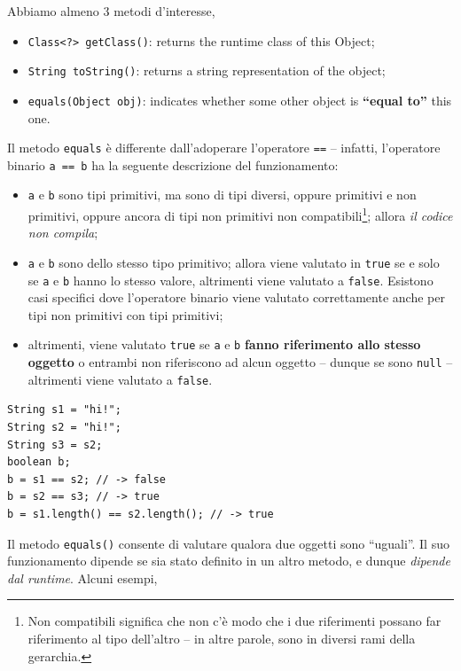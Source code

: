 \documentclass[\fontsizeclass,twocolumn]{\classname}
\theoremstyle{definition}
\theoremstyle{definition}
\begin{document}
Abbiamo almeno $3$ metodi d'interesse,

\begin{itemize}
  \item \texttt{Class<?> getClass()}: returns the runtime class of this Object;
  \item \texttt{String toString()}: returns a string representation of the
  object;
  \item \texttt{equals(Object obj)}: indicates whether some other object is
      \textbf{``equal to''} this one.
\end{itemize}

Il metodo \texttt{equals} è differente dall'adoperare l'operatore \texttt{==}
\--- infatti, l'operatore binario \texttt{a == b} ha la seguente descrizione del
funzionamento:

\begin{itemize}
  \item \texttt{a} e \texttt{b} sono tipi primitivi, ma sono di tipi diversi,
  oppure primitivi e non primitivi, oppure ancora di tipi non primitivi non
  compatibili\footnote{Non compatibili significa che non c'è modo che i due
  riferimenti possano far riferimento al tipo dell'altro \--- in altre parole,
  sono in diversi rami della gerarchia.}; allora \emph{il codice non compila};
  \item \texttt{a} e \texttt{b} sono dello stesso tipo primitivo; allora viene
  valutato in \texttt{true} se e solo se \texttt{a} e \texttt{b} hanno lo stesso
  valore, altrimenti viene valutato a \texttt{false}. Esistono casi specifici
  dove l'operatore binario viene valutato correttamente anche per tipi non
  primitivi con tipi primitivi;
  \item altrimenti, viene valutato \texttt{true} se \texttt{a} e \texttt{b}
  \textbf{fanno riferimento allo stesso oggetto} o entrambi non riferiscono ad
  alcun oggetto \--- dunque se sono \texttt{null} \--- altrimenti viene valutato
  a \texttt{false}.  
\end{itemize}

\begin{lstlisting}
String s1 = "hi!";
String s2 = "hi!";
String s3 = s2;
boolean b;
b = s1 == s2; // -> false
b = s2 == s3; // -> true
b = s1.length() == s2.length(); // -> true
\end{lstlisting}

Il metodo \texttt{equals()} consente di valutare qualora due oggetti sono
``uguali''. Il suo funzionamento dipende se sia stato definito in un altro
metodo, e dunque \emph{dipende dal runtime}. Alcuni esempi,
\end{document}
